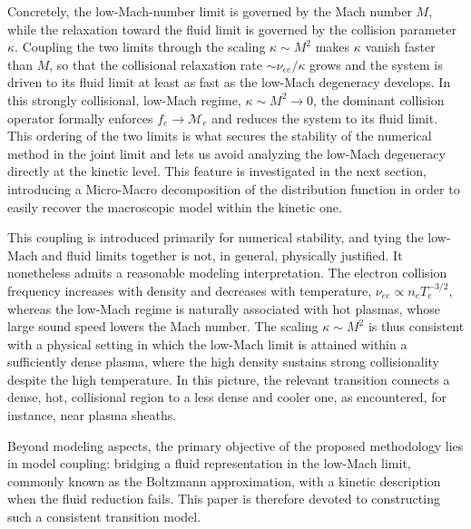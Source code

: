 \documentclass[pdflatex,final,10pt]{article}
\newcommand{\Fabrice}[1]{#1}
\newcommand{\Del}[1]{#1}
\begin{document}
\Fabrice{Concretely, the low-Mach-number limit is governed by the Mach number $M$, while the relaxation toward the fluid limit is governed by the collision parameter $\kappa$. Coupling the two limits through the scaling $\kappa \sim M^2$ makes $\kappa$ vanish faster than $M$, so that the collisional relaxation rate $\sim \nu_{ee}/\kappa$ grows and the system is driven to its fluid limit at least as fast as the low-Mach degeneracy develops. In this strongly collisional, low-Mach regime, $\kappa \sim M^2 \to 0$, the dominant collision operator formally enforces $f_e \to \mathcal{M}_{e}$ and reduces the system to its fluid limit. This ordering of the two limits is what secures the stability of the numerical method in the joint limit and lets us avoid analyzing the low-Mach degeneracy directly at the kinetic level. This feature is investigated in the next section, introducing a Micro-Macro decomposition of the distribution function in order to easily recover the macroscopic model within the kinetic one.}

\Fabrice{This coupling is introduced primarily for numerical stability, and tying the low-Mach and fluid limits together is not, in general, physically justified. It nonetheless admits a reasonable modeling interpretation. The electron collision frequency increases with density and decreases with temperature, $\nu_{ee} \propto n_e T_e^{-3/2}$, whereas the low-Mach regime is naturally associated with hot plasmas, whose large sound speed lowers the Mach number. The scaling $\kappa \sim M^2$ is thus consistent with a physical setting in which the low-Mach limit is attained within a sufficiently dense plasma, where the high density sustains strong collisionality despite the high temperature. In this picture, the relevant transition connects a dense, hot, collisional region to a less dense and cooler one, as encountered, for instance, near plasma sheaths.}

\Fabrice{Beyond modeling aspects, the primary objective of the proposed methodology lies in model coupling: bridging a fluid representation in the low-Mach limit\Del{,} commonly known as the Boltzmann approximation\Del{,} with a kinetic description when the fluid reduction fails. This paper is therefore devoted to constructing such a consistent transition model.}
\end{document}
